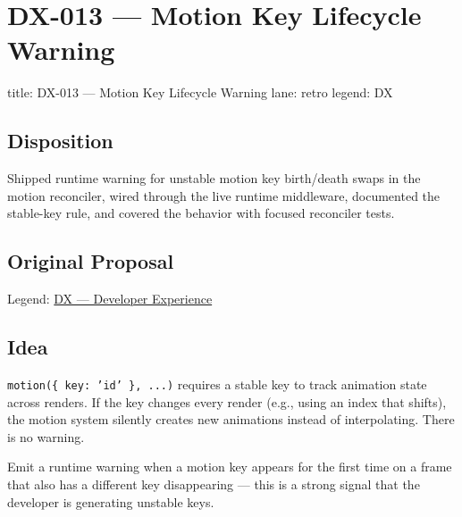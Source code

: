 \chapter{DX-013 --- Motion Key Lifecycle Warning}\label{record-345}

\smallskip

\begin{RecordMeta}
title: DX-013 — Motion Key Lifecycle Warning
lane: retro
legend: DX

\end{RecordMeta}

\section{Disposition}\label{record-345-disposition}

Shipped runtime warning for unstable motion key birth/death swaps in the motion reconciler, wired through the live runtime middleware, documented the stable-key rule, and covered the behavior with focused reconciler tests.

\section{Original Proposal}\label{record-345-original-proposal}

Legend: \href{https://github.com/flyingrobots/bijou/blob/1853ad902f6bf219326409e7f743a5a1d6517dbc/docs/method/legends/DX-developer-experience.md}{DX --- Developer Experience}

\section{Idea}\label{record-345-idea}

\texttt{m\allowbreak{}o\allowbreak{}t\allowbreak{}i\allowbreak{}o\allowbreak{}n\allowbreak{}(\allowbreak{}\{\allowbreak{} \allowbreak{}k\allowbreak{}e\allowbreak{}y\allowbreak{}:\allowbreak{} \allowbreak{}'\allowbreak{}i\allowbreak{}d\allowbreak{}'\allowbreak{} \allowbreak{}\}\allowbreak{},\allowbreak{} \allowbreak{}.\allowbreak{}.\allowbreak{}.\allowbreak{})} requires a stable key to track animation state across renders. If the key changes every render (e.g., using an index that shifts), the motion system silently creates new animations instead of interpolating. There is no warning.

Emit a runtime warning when a motion key appears for the first time on a frame that also has a different key disappearing --- this is a strong signal that the developer is generating unstable keys.

